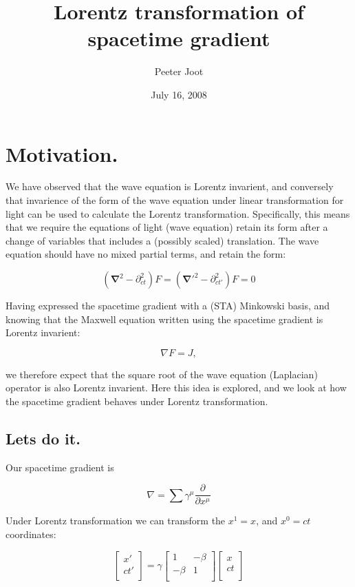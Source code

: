 \documentclass{article}      %
\title{ Lorentz transformation of spacetime gradient }
\author{Peeter Joot}
\date{July 16, 2008}
\newcommand{\spacegrad}[0]{\boldsymbol{\nabla}}
\newcommand{\grad}[0]{\nabla}
\begin{document}

\maketitle{}

\section{ Motivation. }

We have observed that the wave equation is Lorentz invarient, and conversely that invarience of the form of the wave equation under linear transformation for light can be used to calculate the Lorentz transformation.  Specifically, this means that we require the equations of light (wave equation) retain its form after a change of variables that includes
a (possibly scaled) translation.  The wave equation should have no mixed partial terms, and retain the form:

\begin{equation*}
(\spacegrad^2 - \partial_{ct}^2) F = ({\spacegrad'}^2 - \partial_{ct'}^2) F = 0
\end{equation*}

Having expressed the spacetime gradient with a (STA) Minkowski basis, and knowing that the Maxwell equation written using the spacetime gradient is Lorentz invarient:

\begin{equation*}
\grad F = J,
\end{equation*}

we therefore expect that the square root of the wave equation (Laplacian) operator is also Lorentz invarient.  Here this idea is explored, and we look at how the spacetime
gradient behaves under Lorentz transformation.

\subsection{ Lets do it. }

Our spacetime gradient is

\begin{equation*}
\grad = \sum \gamma^{\mu} \frac{\partial}{\partial x^{\mu}}
\end{equation*}

Under Lorentz transformation we can transform the $x^1=x$, and $x^0 = ct$ coordinates:

\begin{equation*}
\begin{bmatrix}
x' \\
ct' \\
\end{bmatrix}
=
\gamma
\begin{bmatrix}
1 & -\beta \\
-\beta & 1 \\
\end{bmatrix}
\begin{bmatrix}
x \\
ct \\
\end{bmatrix}
\end{equation*}
\end{document}
